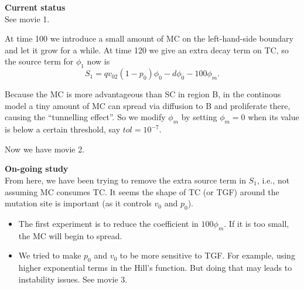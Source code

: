 \documentclass[12pt]{article}
\begin{document}

\noindent\textbf{Current status}\\
See movie 1.

At time 100 we introduce a small amount of MC on the left-hand-side
boundary and let it grow for a while. At time 120 we give
an extra decay term on TC, so the source term for $\phi_1$ now is
$$
S_1 = qv_02(1-p_0)\phi_0 - d\phi_0 - 100\phi_m.
$$

Because the MC is more advantageous than SC in region B, in 
the continous model a tiny amount of MC can spread via diffusion
to B and proliferate there, causing the ``tunnelling effect''.
So we modify $\phi_m$ by setting $\phi_m = 0$ when its value
is below a certain threshold, say $tol = 10^{-7}$.

Now we have movie 2.

\noindent\textbf{On-going study}\\
From here, we have been trying to remove the extra source term
in $S_1$, i.e., not assuming MC consumes TC. It seems the shape
of TC (or TGF) around the mutation site is important 
(as it controls $v_0$ and $p_0$).

\begin{itemize}
\item
The first experiment is to reduce the coefficient
in $100\phi_m$. If it is too small, the MC will begin
to spread. 

\item
We tried to make $p_0$ and $v_0$ to be more sensitive 
to TGF. For example, using higher exponential terms in
the Hill's function. But doing that may leads to instability issues.
See movie 3.
\end{itemize} 
\end{document}
